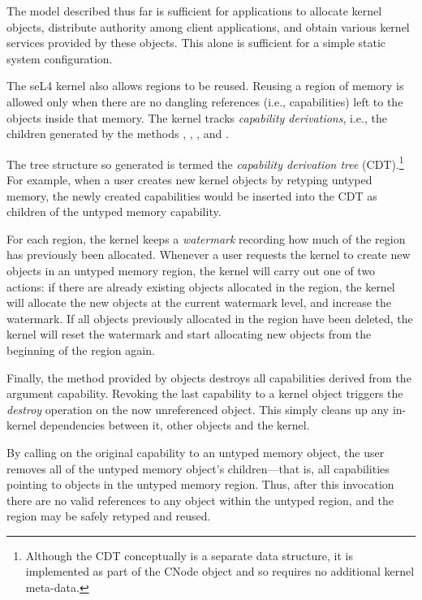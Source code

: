 The model described thus far is sufficient for applications to
allocate kernel objects, distribute authority among client
applications, and obtain various kernel services provided by these
objects.  This alone is sufficient for a simple static system
configuration.

The seL4 kernel also allows  regions to be reused.
Reusing a region of memory is allowed only
when there are no dangling references (i.e., capabilities) left to the
objects inside that memory.  The kernel tracks
\emph{capability derivations}, i.e., the children generated by the
methods , , , and
.

The tree structure so generated is termed the \emph{capability
derivation tree} (CDT).\footnote{Although the CDT conceptually is a separate
data structure, it is implemented as part of the CNode object and so
requires no additional kernel meta-data.}  For example, when a user
creates new kernel objects by retyping untyped memory, the newly created
capabilities would be inserted into the CDT as children of the untyped
memory capability.

For each  region, the kernel keeps
a \emph{watermark} recording how much of the region has previously been
allocated. Whenever a user requests the kernel to create new objects in
an untyped memory region, the kernel will carry out one of two actions:
if there are already existing objects allocated in the region, the
kernel will allocate the new objects at the current watermark level, and
increase the watermark. If all objects previously allocated in the
region have been deleted, the kernel will reset the watermark and start
allocating new objects from the beginning of the region again.

Finally, the  method provided by  objects
destroys all capabilities derived from the argument capability. Revoking
the last capability to a kernel object triggers the \emph{destroy}
operation on the now unreferenced object. This simply cleans up any in-kernel dependencies between
it, other objects and the kernel.

By calling  on the original capability to an untyped memory
object, the user removes all of the untyped memory object's
children---that is, all capabilities pointing to objects in the untyped
memory region.  Thus, after this invocation there are no valid references
to any object within the untyped region, and the region may be safely
retyped and reused.

